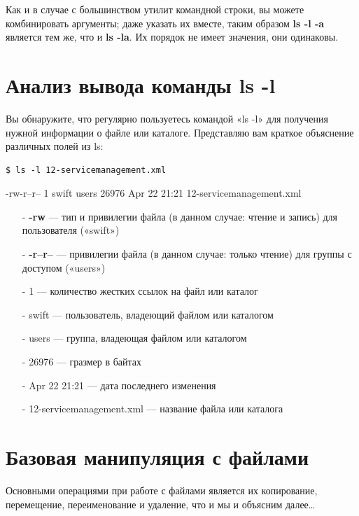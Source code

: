 \documentclass[10pt]{book}
\begin{document}
Как и в случае с большинством утилит командной строки, вы можете комбинировать аргументы; даже указать их вместе, таким образом \textbf{ls -l -a} является тем же, что и \textbf{ls -la}. Их порядок не имеет значения, они одинаковы.

\section{Анализ вывода команды ls -l}

Вы обнаружите, что регулярно пользуетесь командой «ls -l» для получения нужной информации о файле или каталоге. Представляю вам краткое объяснение  различных полей из ls:

\vspace{3mm}
\begin{tcolorbox}
\begin{lstlisting}
$ ls -l 12-servicemanagement.xml
\end{lstlisting}
-rw-r--r-- 1 swift users 26976 Apr 22 21:21 12-servicemanagement.xml

\end{tcolorbox}

\begin{itemize}
	\item[-] \textbf{-rw} — тип и привилегии файла (в данном случае: чтение и запись) для пользователя («swift»)
	\item[-] \textbf{-r--r--} — привилегии файла (в данном случае: только чтение) для группы с доступом («users»)
	\item[-] 1 — количество жестких ссылок на файл или каталог
	\item[-] swift — пользователь, владеющий файлом или каталогом
	\item[-] users — группа, владеющая файлом или каталогом
	\item[-] 26976 — гразмер в байтах
	\item[-] Apr 22 21:21 — дата последнего изменения
	\item[-] 12-servicemanagement.xml — название файла или каталога
\end{itemize}

\section{Базовая манипуляция с файлами}

Основными операциями при работе с файлами является их копирование, перемещение, переименование и удаление, что и мы и объясним далее\ldots
\end{document}

